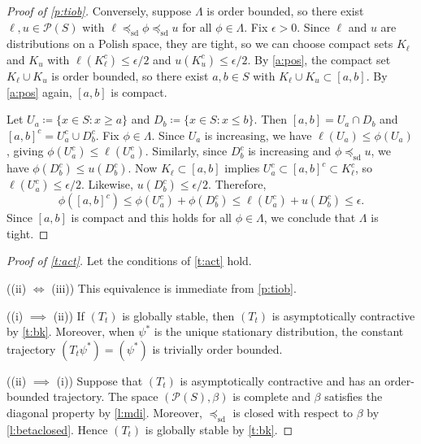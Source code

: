 \documentclass[12pt,reqno]{amsart}
\numberwithin{equation}{section}
\theoremstyle{definition}
\newcommand{\1}{\mathbbm{1}}
\newcommand{\pP}{\mathscr{P}}
\newcommand{\precsd}{\preceq_{\textrm{sd}}}
\begin{document}
\begin{proof}[Proof of \cref{p:tiob}]
    Conversely, suppose $\Lambda$ is order bounded, so there exist $\ell, u \in
    \pP(S)$ with $\ell \precsd \phi \precsd u$ for all $\phi \in \Lambda$.  Fix
    $\epsilon > 0$.  Since $\ell$ and $u$ are distributions on a Polish space,
    they are tight, so we can choose compact sets $K_\ell$ and $K_u$ with
    $\ell(K_\ell^c) \leq \epsilon/2$ and $u(K_u^c) \leq \epsilon/2$.  By
    \cref{a:pos}, the compact set $K_\ell \cup K_u$ is order bounded, so there
    exist $a, b \in S$ with $K_\ell \cup K_u \subset [a, b]$.  By \cref{a:pos}
    again, $[a, b]$ is compact.

    Let $U_a \coloneq \{x \in S : x \geq a\}$ and $D_b \coloneq \{x \in S : x
    \leq b\}$.  Then $[a,b] = U_a \cap D_b$ and $[a,b]^c = U_a^c \cup D_b^c$.
    Fix $\phi \in \Lambda$.  Since $U_a$ is increasing, we have $\ell(U_a) \leq
    \phi(U_a)$, giving $\phi(U_a^c) \leq \ell(U_a^c)$.  Similarly, since
    $D_b^c$ is increasing and $\phi \precsd u$, we have $\phi(D_b^c) \leq
    u(D_b^c)$.  Now $K_\ell \subset [a,b]$ implies $U_a^c \subset [a,b]^c
    \subset K_\ell^c$, so $\ell(U_a^c) \leq \epsilon/2$.  Likewise, $u(D_b^c)
    \leq \epsilon/2$.  Therefore,
    \begin{equation*}
        \phi([a,b]^c)
        \leq \phi(U_a^c) + \phi(D_b^c)
        \leq \ell(U_a^c) + u(D_b^c)
        \leq \epsilon.
    \end{equation*}
    Since $[a,b]$ is compact and this holds for all $\phi \in \Lambda$, we conclude
    that $\Lambda$ is tight.
\end{proof}

\begin{proof}[Proof of \cref{t:act}]
    Let the conditions of \cref{t:act} hold.

    ((ii) $\Leftrightarrow$ (iii)) This equivalence is immediate from \cref{p:tiob}.

    ((i) $\implies$ (ii))  If $(T_t)$ is globally stable, then $(T_t)$ is asymptotically
    contractive by \cref{t:bk}.  Moreover, when $\psi^*$ is the unique
    stationary distribution, the constant trajectory $(T_t \psi^*) = (\psi^*)$
    is trivially order bounded.

    ((ii) $\implies$ (i))
    Suppose that $(T_t)$ is asymptotically contractive and has an order-bounded trajectory.
    The space $(\pP(S), \beta)$ is complete and $\beta$ satisfies the diagonal
    property by \cref{l:mdi}.  Moreover, $\precsd$ is closed with respect to
    $\beta$ by \cref{l:betaclosed}.  Hence $(T_t)$ is globally stable by \cref{t:bk}.
\end{proof}
\end{document}
